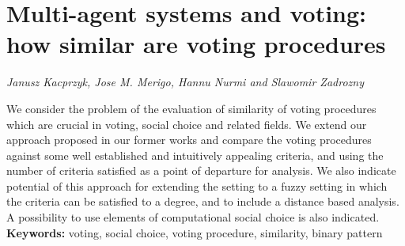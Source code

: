 \documentclass[../booklet.tex]{subfiles}
\begin{document}
\section[Multi-agent systems and voting: how similar are voting procedures. {\it Janusz Kacprzyk, Jose M. Merigo, Hannu Nurmi and Slawomir Zadrozny}]{Multi-agent systems and voting: how similar are voting procedures}
   

\begin{center}
  {\it Janusz Kacprzyk, Jose M. Merigo, Hannu Nurmi and Slawomir Zadrozny}
\end{center}

\vskip 0.8cm


We consider the problem of the evaluation of similarity of voting procedures which are crucial in voting, social choice and related fields. We extend our approach 
proposed in our former works and compare the voting procedures against some well established and intuitively appealing 
criteria, and using the number of criteria satisfied as a point of departure for analysis. We also indicate potential of this approach for 
extending the setting to a fuzzy setting in which the criteria can be satisfied to a degree, and to include  a distance based analysis. A possibility to use elements of computational social choice is also indicated.\\[0.5cm]
\textbf{Keywords:} voting, social choice, voting procedure, similarity, binary pattern
\end{document}
